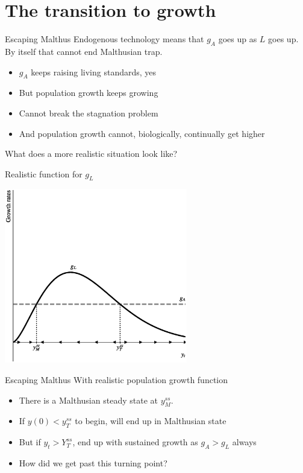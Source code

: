 \section{The transition to growth}
\begin{frame}{Escaping Malthus}
Endogenous technology means that $g_A$ goes up as $L$ goes up. By itself that cannot end Malthusian trap.
\begin{itemize}
	\item $g_A$ keeps raising living standards, yes
	\item But population growth keeps growing
	\item Cannot break the stagnation problem
	\item And population growth cannot, biologically, continually get higher
\end{itemize}
What does a more realistic situation look like?
\end{frame}

\begin{frame}{Realistic function for $g_L$}
\begin{center}
\includegraphics[height=3in]{../Figures/fig-ch9-fig4.eps}
\end{center}
\end{frame}

\begin{frame}{Escaping Malthus}
With realistic population growth function
\begin{itemize}
	\item There is a Malthusian steady state at $y_M^{ss}$. 
	\item If $y(0) < y^{ss}_T$ to begin, will end up in Malthusian state
	\item But if $y_t > Y^{ss}_T$, end up with sustained growth as $g_A > g_L$ always
	\item How did we get past this turning point?
\end{itemize}
\end{frame}

